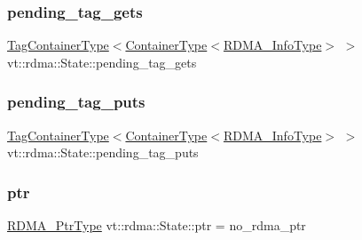 \mbox{\label{structvt_1_1rdma_1_1_state_ac2da68e9bf531013beb9b5d903e0143f}} 
\subsubsection{\texorpdfstring{pending\+\_\+tag\+\_\+gets}{pending\_tag\_gets}}
{\footnotesize\ttfamily \hyperlink{structvt_1_1rdma_1_1_state_ad84b403803cc575ef54d0d0ac74017e9}{Tag\+Container\+Type}$<$\hyperlink{structvt_1_1rdma_1_1_state_a7506401f1846be85f14e73e75b773a5d}{Container\+Type}$<$\hyperlink{structvt_1_1rdma_1_1_state_a6a78216795efe7fb6966c33b1a21d7cf}{R\+D\+M\+A\+\_\+\+Info\+Type}$>$ $>$ vt\+::rdma\+::\+State\+::pending\+\_\+tag\+\_\+gets\hspace{0.3cm}{\ttfamily [private]}}

\mbox{\label{structvt_1_1rdma_1_1_state_a3acc777f93b5618bba0a7626e661578c}} 
\subsubsection{\texorpdfstring{pending\+\_\+tag\+\_\+puts}{pending\_tag\_puts}}
{\footnotesize\ttfamily \hyperlink{structvt_1_1rdma_1_1_state_ad84b403803cc575ef54d0d0ac74017e9}{Tag\+Container\+Type}$<$\hyperlink{structvt_1_1rdma_1_1_state_a7506401f1846be85f14e73e75b773a5d}{Container\+Type}$<$\hyperlink{structvt_1_1rdma_1_1_state_a6a78216795efe7fb6966c33b1a21d7cf}{R\+D\+M\+A\+\_\+\+Info\+Type}$>$ $>$ vt\+::rdma\+::\+State\+::pending\+\_\+tag\+\_\+puts\hspace{0.3cm}{\ttfamily [private]}}

\mbox{\label{structvt_1_1rdma_1_1_state_a60bb2c1f277de56d89e741f87e944c93}} 
\subsubsection{\texorpdfstring{ptr}{ptr}}
{\footnotesize\ttfamily \hyperlink{namespacevt_a9e2c953286c7616f7c218e9951790776}{R\+D\+M\+A\+\_\+\+Ptr\+Type} vt\+::rdma\+::\+State\+::ptr = no\+\_\+rdma\+\_\+ptr}

